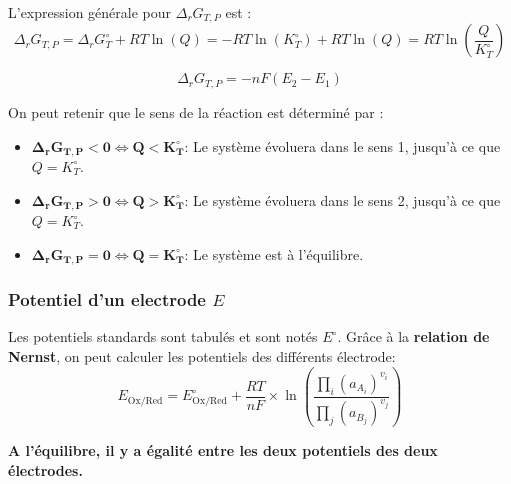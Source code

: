 \documentclass[a4paper,12pt]{article}
\begin{document}
                L'expression générale pour $\Delta_r G_{T,P}$ est :
                    $$ \boxed{ \Delta_r G_{T,P} = \Delta_r G_T^{\circ} + RT \ln{(Q)} = -RT \ln{(K_T^{\circ})} + RT \ln{(Q)} = RT \ln{\left(\frac{Q}{K_T^{\circ}}\right)} } $$

                    $$ \boxed{ \Delta_r G_{T,P} = -n F (E_2-E_1) } $$

                On peut retenir que le sens de la réaction est déterminé par :
                
                \begin{itemize}[label=\textbullet]
                    \item $ \bm{ \Delta_r G_{T,P} < 0 \Longleftrightarrow Q < K_T^{\circ} } $: Le système évoluera dans le sens 1, jusqu'à ce que $ Q = K_T^{\circ} $.
                    \item $ \bm{ \Delta_r G_{T,P} > 0 \Longleftrightarrow Q > K_T^{\circ} } $: Le système évoluera dans le sens 2, jusqu'à ce que $ Q = K_T^{\circ} $.
                    \item $ \bm{ \Delta_r G_{T,P} = 0 \Longleftrightarrow Q = K_T^{\circ} } $: Le système est à l'équilibre.
                \end{itemize}

            \subsubsection*{Potentiel d'un electrode $E$}
                Les potentiels standards sont tabulés et sont notés $E^\circ$.
                Grâce à la \textbf{relation de Nernst}, on peut calculer les potentiels des différents électrode:
                    $$ E_{\text{Ox/Red}} = E^\circ_{\text{Ox/Red}} + \frac{RT}{nF} \times \ln{\left( \frac{\prod_i (a_{A_i})^{v_i}}{\prod_j (a_{B_j})^{v_j}}\right)} $$
                
                \textbf{A l'équilibre, il y a égalité entre les deux potentiels des deux électrodes.}
\end{document}
